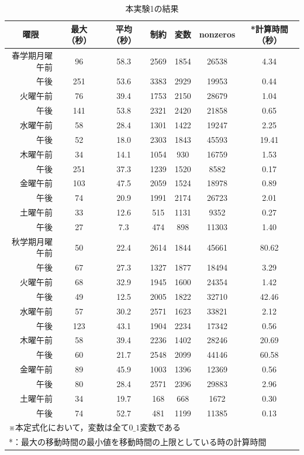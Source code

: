 \documentclass[12pt, a4paper, fleqn]{jreport}
\begin{document}
\begin{table}[H]
\begin{center}
\caption{本実験1の結果}
\label{j:normal_information}
\begin{tabular}{|r|cccccc|}
\hline
 \multicolumn{1}{|c|}{曜限} &  最大（秒）  & 平均（秒） & 制約 & 変数 & nonzeros & *計算時間（秒）\\
\hline
春学期月曜午前  & 96  & 58.3 & 2569 & 1854 & 26538 &  4.34\\  
午後            & 251 & 53.6 & 3383 & 2929 & 19953 &  0.44\\
火曜午前        & 76  & 39.4 & 1753 & 2150 & 28679 &  1.04\\
午後            & 141 & 53.8 & 2321 & 2420 & 21858 &  0.65\\
水曜午前        & 58  & 28.4 & 1301 & 1422 & 19247 &  2.25\\
午後            & 52  & 18.0 & 2303 & 1843 & 45593 & 19.41\\
木曜午前        & 34  & 14.1 & 1054 & 930  & 16759 &  1.53\\
午後            & 251 & 37.3 & 1239 & 1520 & 8582  &  0.17\\
金曜午前        & 103 & 47.5 & 2059 & 1524 & 18978 &  0.89\\
午後            & 74  & 20.9 & 1991 & 2174 & 26723 &  2.01\\
土曜午前        & 33  & 12.6 & 515  & 1131 & 9352  &  0.27\\
午後            & 27  & 7.3  & 474  & 898  & 11303 &  1.40\\
\hline                                        	         
秋学期月曜午前  & 50  & 22.4 & 2614 & 1844 & 45661 & 80.62\\
午後            & 67  & 27.3 & 1327 & 1877 & 18494 &  3.29\\          
火曜午前        & 68  & 32.9 & 1945 & 1600 & 24354 &  1.42\\
午後            & 49  & 12.5 & 2005 & 1822 & 32710 & 42.46\\          
水曜午前        & 57  & 30.2 & 2571 & 1623 & 33821 &  2.12\\
午後            & 123 & 43.1 & 1904 & 2234 & 17342 &  0.56\\          
木曜午前        & 58  & 39.4 & 2236 & 1402 & 28246 & 20.69\\
午後            & 60  & 21.7 & 2548 & 2099 & 44146 & 60.58\\          
金曜午前        & 89  & 45.9 & 1003 & 1396 & 12369 &  0.56\\
午後            & 80  & 28.4 & 2571 & 2396 & 29883 &  2.96\\          
土曜午前        & 34  & 19.7 & 168  & 668  & 1672  &  0.30\\
午後            & 74  & 52.7 & 481  & 1199 & 11385 &  0.13\\
\hline
\multicolumn{7}{l}{※本定式化において，変数は全て$0\_1$変数である}\\
\multicolumn{7}{l}{*：最大の移動時間の最小値を移動時間の上限としている時の計算時間}\\
\end{tabular}
\end{center}
\end{table}
\end{document}
